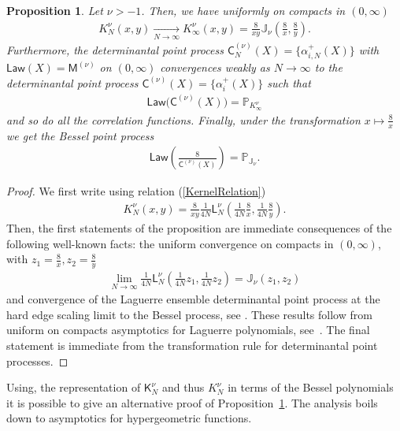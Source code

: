 \documentclass[11pt]{article}
\numberwithin{equation}{section}
\newtheorem{Proposition}[Theorem]{Proposition}
{ \theoremstyle{definition}
\newtheorem{Definition}[Theorem]{Definition}
\newtheorem{Remark}[Theorem]{Remark} }
\begin{document}
\begin{Proposition}\label{PropositionLimitCorrelationAlphaPlus}
Let $\nu>-1$. Then, we have uniformly on compacts in $(0,\infty)$
\begin{gather*}
K_N^{\nu}(x,y)\underset{N\to \infty}{\longrightarrow}K_\infty^{\nu}(x,y)=\frac{8}{xy}\mathbb{J}_{\nu}\left(\frac{8}{x},\frac{8}{y}\right).
\end{gather*}
Furthermore, the determinantal point process $\mathsf{C}^{(\nu)}_{N}(X)=\{\alpha_{i,N}^+(X) \}$ with $\mathsf{Law}(X)=\mathsf{M}^{(\nu)}$ on $(0,\infty)$ convergences weakly as $N \to \infty$ to the determinantal point process $\mathsf{C}^{(\nu)}(X)=\{ \alpha_{i}^+(X) \}$ such that
\begin{gather*}
\mathsf{Law}\big(\mathsf{C}^{(\nu)}(X)\big)=\mathbb{P}_{K_{\infty}^{\nu}}
\end{gather*}
and so do all the correlation functions.
Finally, under the transformation $x \mapsto \frac{8}{x}$ we get the Bessel point process
\begin{gather*}
\mathsf{Law}\left(\frac{8}{\mathsf{C}^{(\nu)}(X)}\right)=\mathbb{P}_{\mathbb{J}_{\nu}}.
\end{gather*}
\end{Proposition}

\begin{proof}
We first write using relation (\ref{KernelRelation})
\begin{gather*}
K_N^{\nu}(x,y)=\frac{8}{xy}\frac{1}{4N}\mathsf{L}_{N}^{\nu}\left(\frac{1}{4N}\frac{8}{x},\frac{1}{4N}\frac{8}{y}\right).
\end{gather*}
Then, the first statements of the proposition are immediate consequences of the following well-known facts: the uniform convergence on compacts in $(0,\infty)$, with $z_1=\frac{8}{x}, z_2=\frac{8}{y}$
\begin{gather*}
\lim_{N \to \infty}\frac{1}{4N}\mathsf{L}_N^{\nu}\left(\frac{1}{4N}z_1,\frac{1}{4N}z_2\right)=\mathbb{J}_{\nu}(z_1,z_2)
\end{gather*}
and convergence of the Laguerre ensemble determinantal point process at the hard edge scaling limit to the Bessel process, see \cite{ForresterBessel,Forrester, TracyWidom}. These results follow from uniform on compacts asymptotics for Laguerre polynomials, see~\cite{Szego}. The final statement is immediate from the transformation rule for determinantal point processes.
\end{proof}

\begin{Remark}Using, the representation of $\mathsf{K}_N^{\nu}$ and thus $K_N^\nu$ in terms of the Bessel polynomials it is possible to give an alternative proof of Proposition~\ref{PropositionLimitCorrelationAlphaPlus}. The analysis boils down to asymptotics for hypergeometric functions.
\end{Remark}
\end{document}

